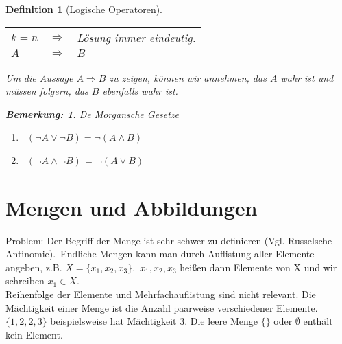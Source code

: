 \documentclass{report}
\newcommand{\IN}[1]{\index{#1|BH}}
\theoremstyle{customrem}
\newtheorem*{bem}{Bemerkung:}
\theoremstyle{customdef}
\newtheorem{definition}{Definition}[chapter]
\begin{document}
\begin{definition}[Logische Operatoren]
		\begin{center}
			\begin{tabular}{l c l}
				$k = n$ & $\Rightarrow$ & Lösung immer eindeutig.\\
				$A$ & $\Rightarrow$ &  $B$\\
			\end{tabular}
		\end{center}
		Um die Aussage $A \Rightarrow B$ zu zeigen, können wir annehmen, das $A$ wahr ist und müssen folgern, das $B$ ebenfalls wahr ist.\\
		\begin{bem} De Morgansche Gesetze
			\begin{enumerate}
				\item\ $(\neg A \lor \neg B) = \neg (A \land B)$
				\item\ $(\neg A \land \neg B)$ = $\neg (A \lor B)$
			\end{enumerate}
		\end{bem}
	\end{definition}


\section{Mengen und Abbildungen}
	\IN{Menge}
	Problem: Der Begriff der Menge ist sehr schwer zu definieren (Vgl. Russelsche Antinomie).\
	Endliche Mengen kann man durch Auflistung aller Elemente angeben, z.B. $X = \{x_1, x_2, x_3\}$.\ $x_1, x_2, x_3$ heißen dann Elemente von X und wir schreiben $x_1 \in X$.\\
	Reihenfolge der Elemente und Mehrfachauflistung sind nicht relevant. Die Mächtigkeit einer Menge ist die Anzahl paarweise verschiedener Elemente. $\{1, 2, 2, 3\}$ beispielsweise hat Mächtigkeit $3$.
	Die leere Menge $\{\}$ oder $\emptyset$ enthält kein Element.
\end{document}
